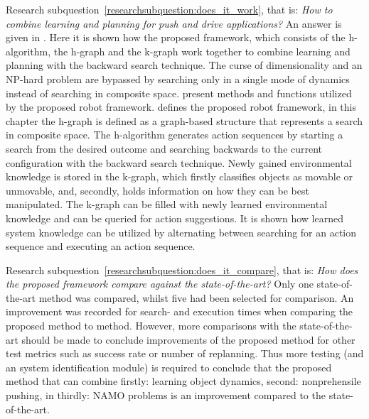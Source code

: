 Research subquestion~\ref{researchsubquestion:does_it_work}, that is: \textit{How to combine learning and planning for push and drive applications?} An answer is given in . Here it is shown how the proposed framework, which consists of the \acf{h-algorithm}, the \acf{h-graph} and the \acf{k-graph} work together to combine learning and planning with the backward search technique. The curse of dimensionality and an \ac{NP-hard} problem are bypassed by searching only in a single mode of dynamics instead of searching in composite space.  present methods and functions utilized by the proposed robot framework.  defines the proposed robot framework, in this chapter the \ac{h-graph} is defined as a graph-based structure that represents a search in composite space. The \ac{h-algorithm} generates action sequences by starting a search from the desired outcome and searching backwards to the current configuration with the backward search technique. Newly gained environmental knowledge is stored in the \ac{k-graph}, which firstly classifies objects as movable or unmovable, and, secondly, holds information on how they can be best manipulated. The \ac{k-graph} can be filled with newly learned environmental knowledge and can be queried for action suggestions. It is shown how learned system knowledge can be utilized by alternating between searching for an action sequence and executing an action sequence.\bs

Research subquestion~\ref{researchsubquestion:does_it_compare}, that is: \textit{How does the proposed framework compare against the state-of-the-art?} Only one state-of-the-art method was compared, whilst five had been selected for comparison. An improvement was recorded for search- and execution times when comparing the proposed method to \citeauthor{wang_affordancebased_2020} method. However, more comparisons with the state-of-the-art should be made to conclude improvements of the proposed method for other test metrics such as success rate or number of replanning. Thus more testing (and an system identification module) is required to conclude that the proposed method that can combine firstly: learning object dynamics, second: nonprehensile pushing, in thirdly: \ac{NAMO} problems is an improvement compared to the state-of-the-art.\bs

